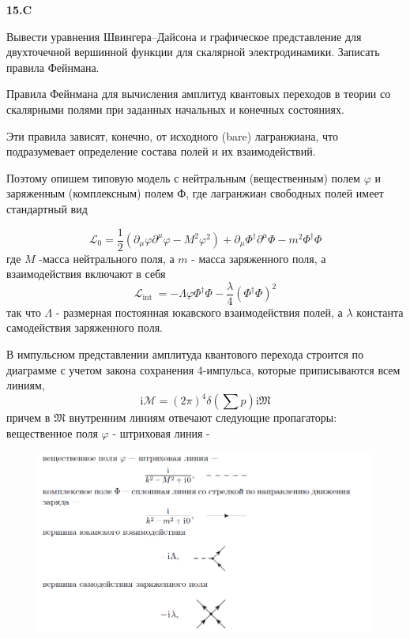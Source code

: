 \documentclass[a4paper,12pt]{article} %
\begin{document}
\begin{ttask}\textbf{15.C} 

Вывести уравнения Швингера–Дайсона и графическое представление для двухточечной вершинной функции для 
скалярной электродинамики. 
Записать правила Фейнмана. 







Правила Фейнмана для вычисления амплитуд квантовых переходов
в теории со скалярными   полями   при   заданных   начальных  и   конечных  состояниях. 


Эти правила зависят, конечно, от исходного (bare) лагранжиана, 
что подразумевает определение состава полей и их взаимодействий. 


Поэтому опишем типовую модель с нейтральным (вещественным) полем $\varphi$ и 
заряженным (комплексным) полем Ф, где лагранжиан свободных полей имеет стандартный вид

$$
\mathcal{L}_{0}=\frac{1}{2}\left(\partial_{\mu} \varphi \partial^{\mu} \varphi-M^{2} \varphi^{2}\right)+\partial_{\mu} \Phi^{\dagger} \partial^{\mu} \Phi-m^{2} \Phi^{\dagger} \Phi
$$
где $M$ -масса нейтрального поля, а $m$ - масса заряженного поля, а взаимодействия включают в себя
$$
\mathcal{L}_{\text {int }}=-\Lambda \varphi \Phi^{\dagger} \Phi-\frac{\lambda}{4}\left(\Phi^{\dagger} \Phi\right)^{2}
$$
так что $\Lambda$ - размерная постоянная юкавского взаимодействия полей, а $\lambda$ константа самодействия заряженного поля.

В импульсном представлении амплитуда квантового перехода строится по диаграмме с учетом закона сохранения 4-импульса, которые приписываются
всем линиям,
$$
\mathrm{i} \mathcal{M}=(2 \pi)^{4} \delta\left(\sum p\right) \mathrm{i} \mathfrak{M}
$$
причем в $\mathfrak{M}$ внутренним линиям отвечают следующие пропагаторы:
вещественное поля $\varphi$ - штриховая линия -



\begin{figure}[H]
	\centering
	\includegraphics[width=1\linewidth]{pic/feym2}
	\caption{}
	\label{fig:feym2}
\end{figure}







\end{ttask}
\end{document}

